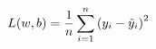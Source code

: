 \documentclass[preview]{standalone}
\begin{document}
\begin{align*}
\special{dvisvgm:raw <g id='unique000'>}L(w, b) = \frac{1}{n}\sum_{i=1}^{n}\left(y_i - \hat{y}_i\right)^{2}\special{dvisvgm:raw </g>}
\end{align*}
\end{document}
